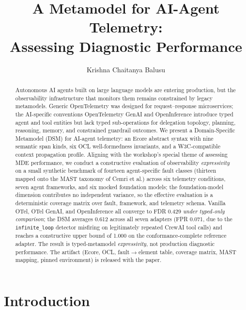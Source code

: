 \documentclass[sigconf,nonacm]{acmart}
\begin{document}
\title{A Metamodel for AI-Agent Telemetry:\\Assessing Diagnostic Performance}

\author{Krishna Chaitanya Balusu}

\begin{abstract}
Autonomous AI agents built on large language models are entering production, but the observability infrastructure that monitors them remains constrained by legacy metamodels. Generic OpenTelemetry was designed for request--response microservices; the AI-specific conventions OpenTelemetry GenAI and OpenInference introduce typed agent and tool entities but lack typed sub-operations for delegation topology, planning, reasoning, memory, and constrained guardrail outcomes. We present a Domain-Specific Metamodel (DSM) for AI-agent telemetry: an Ecore abstract syntax with nine semantic span kinds, six OCL well-formedness invariants, and a W3C-compatible context propagation profile. Aligning with the workshop's special theme of assessing MDE performance, we conduct a constructive evaluation of observability \emph{expressivity} on a small synthetic benchmark of fourteen agent-specific fault classes (thirteen mapped onto the MAST taxonomy of Cemri et al.) across six telemetry conditions, seven agent frameworks, and six mocked foundation models; the foundation-model dimension contributes no independent variance, so the effective evaluation is a deterministic coverage matrix over fault, framework, and telemetry schema. Vanilla OTel, OTel GenAI, and OpenInference all converge to FDR 0.429 \emph{under typed-only comparison}; the DSM averages 0.612 across all seven adapters (FPR 0.071, due to the \texttt{infinite\_loop} detector misfiring on legitimately repeated CrewAI tool calls) and reaches a constructive upper bound of 1.000 on the conformance-complete reference adapter. The result is typed-metamodel \emph{expressivity}, not production diagnostic performance. The artifact (Ecore, OCL, fault$\rightarrow$element table, coverage matrix, MAST mapping, pinned environment) is released with the paper.
\end{abstract}

\maketitle

\section{Introduction}
\end{document}
